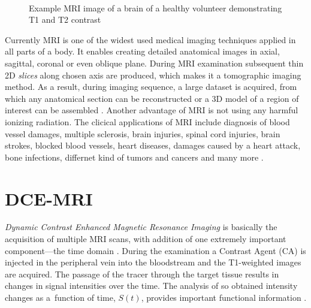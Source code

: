  
\begin{figure}
\captionsetup[subfloat]{captionskip=0.5cm}
	\centering
	\hspace{1.5cm}
	\\	
\vspace{0.5cm}
\caption[Comparison of \textit{T\textsubscript{1}} and \textit{T\textsubscript{2}} weighted images]{Example MRI image of a brain of a healthy volunteer demonstrating T1 and T2 contrast}
\label{fig:t1t2}
\end{figure}

Currently MRI is one of the widest used medical imaging techniques applied in all parts of a body. It enables creating detailed anatomical images in axial, sagittal, coronal or even oblique plane. During MRI examination subsequent thin 2D \textit{slices} along chosen axis are produced, which makes it a tomographic imaging method. As a result, during imaging sequence, a large dataset is acquired, from which any anatomical section can be reconstructed or a 3D model of a region of interest can be assembled \cite {bushong2014magnetic}. Another advantage of MRI is not using any harmful ionizing radiation.
The clicical applications of MRI include diagnosis of blood vessel damages, multiple sclerosis, brain injuries, spinal cord injuries, brain strokes, blocked blood vessels, heart diseases, damages caused by a heart attack, bone infections, differnet kind of tumors and cancers and many more \cite{mriApplications}.

\section{DCE-MRI}
\textit{Dynamic Contrast Enhanced Magnetic Resonance Imaging} is basically the acquisition of multiple MRI scans, with addition of one extremely important component---the time domain \cite{jackson2005dynamic}. During the examination a Contrast Agent (CA) is injected in the peripheral vein into the bloodstream and the T1-weighted images are acquired. 
The passage of the tracer through the target tissue results in changes in signal intensities over the time.
The analysis of so obtained intensity changes as a~function of time, $S(t)$, provides important functional information \cite{bokacheva2008assessment, khalifa2014models}. 

\begin{comment}
Traditionally, this evaluation is performed by experienced observer, although this method is very subjective and strongly depends on the experience of the expert. Other technique involves fitting tissue intensity changes to pharmacokinetic models, which allows quantification of renal function \cite{khalifa2014models}. Even though this strategy is gaining more and more supporters, most of the methods still require interference of the human at some stage, which makes them vulnerable to human factors.
\end{comment}
